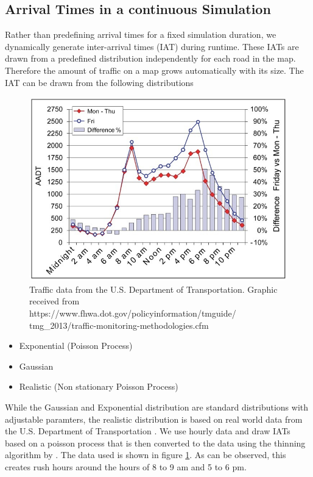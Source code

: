 \documentclass[10pt]{article}
\begin{document}
\subsection{Arrival Times in a continuous Simulation}
Rather than predefining arrival times for a fixed simulation duration, we dynamically generate inter-arrival times (IAT) during runtime. These IATs are drawn from a predefined distribution independently for each road in the map. Therefore the amount of traffic on a map grows automatically with its size. The IAT can be drawn from the following distributions

\begin{figure}[t]
	\includegraphics[width=\linewidth]{img/traffic-data.jpeg}
	\caption{Traffic data from the U.S. Department of Transportation. Graphic received from https://www.fhwa.dot.gov/policyinformation/tmguide/
	tmg\_2013/traffic-monitoring-methodologies.cfm \label{fig:traffic-data}}
\end{figure} 
 
\begin{itemize}
	\item Exponential (Poisson Process)
	\item Gaussian
	\item Realistic (Non stationary Poisson Process)
\end{itemize}
 
While the Gaussian and Exponential distribution are standard distributions with adjustable paramters, the realistic distribution is based on real world data from the U.S. Department of Transportation \citep{trafficdata}. We use hourly data and draw IATs based on a poisson process that is then converted to the data using the thinning algorithm by \citet{lewis1979simulation}. The data used is shown in figure \ref{fig:traffic-data}. As can be observed, this creates rush hours around the hours of 8 to 9 am and 5 to 6 pm.
\end{document}
